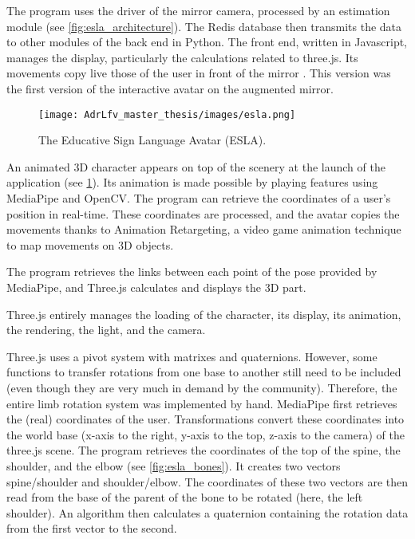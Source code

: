 The program uses the driver of the mirror camera, processed by an estimation module (see \ref{fig:esla_architecture}). The Redis database then transmits the data to other modules of the back end in Python. The front end, written in Javascript, manages the display, particularly the calculations related to three.js. Its movements copy live those of the user in front of the mirror \cite{esla}. This version was the first version of the interactive avatar on the augmented mirror.


\begin{figure}[h]
    \centering
    \texttt{[image: AdrLfv\_master\_thesis/images/esla.png]}
    \caption{The Educative Sign Language Avatar (ESLA).}
    \label{fig:esla}
\end{figure}


An animated 3D character appears on top of the scenery at the launch of the application (see \ref{fig:esla}). Its animation is made possible by playing features using MediaPipe and OpenCV. The program can retrieve the coordinates of a user's position in real-time. These coordinates are processed, and the avatar copies the movements thanks to Animation Retargeting, a video game animation technique to map movements on 3D objects.

The program retrieves the links between each point of the pose provided by MediaPipe, and Three.js calculates and displays the 3D part. 

Three.js entirely manages the loading of the character, its display, its animation, the rendering, the light, and the camera.

Three.js uses a pivot system with matrixes and quaternions. However, some functions to transfer rotations from one base to
another still need to be included (even though they are very much in demand by the community). Therefore, the entire limb rotation system was implemented by hand.
MediaPipe first retrieves the (real) coordinates of the user. Transformations convert these coordinates into the world base (x-axis to the right, y-axis to the top, z-axis to the camera) of the three.js scene. The program retrieves the coordinates of the top of the spine, the shoulder, and the elbow (see \ref{fig:esla_bones}). It creates two vectors spine/shoulder and shoulder/elbow. The coordinates of these two vectors are then read from the base of the parent of the bone to be rotated (here, the left shoulder). An algorithm then calculates a quaternion containing the rotation data from the first vector to the second.

